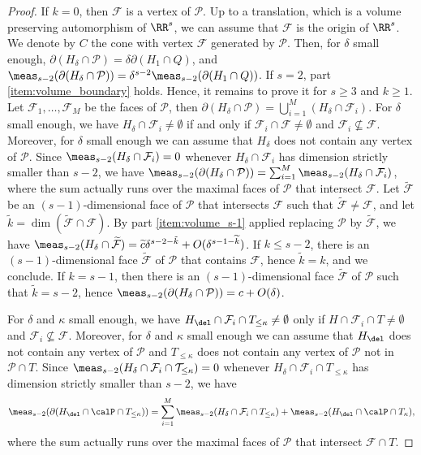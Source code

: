 \begin{proof}
If $k=0$, then $\mathcal F$ is a vertex of $\mathcal P$.
Up to a translation, which is a volume preserving automorphism of $\RR^s$,
we can assume that $\mathcal F$ is the origin of $\RR^s$.
We denote by $C$ the cone with vertex $\mathcal F$ generated by $\mathcal P$.
Then, for $\delta$ small enough,
$\partial(H_\delta\cap\mathcal P)=\delta\partial(H_1\cap Q)$,
and $\meas_{s-2}(\partial(H_\delta\cap\mathcal P))=\delta^{s-2}\meas_{s-2} (\partial(H_1\cap Q))$.
If $s=2$, part \eqref{item:volume_boundary} holds. Hence, it remains to prove it
for $s\geq3$ and $k\geq1$.
Let $\mathcal F_1,\dots,\mathcal F_M$ be the faces of $\mathcal P$,
then $\partial (H_\delta\cap\mathcal P)=\bigcup_{i=1}^M(H_\delta\cap\mathcal F_i)$.
For $\delta$ small enough, we have $H_\delta\cap\mathcal F_i\neq\emptyset$
if and only if $\mathcal F_i\cap\mathcal F\neq\emptyset$ and $\mathcal F_i\nsubseteq\mathcal F$.
Moreover, for $\delta$ small enough we can assume that $H_\delta$
does not contain any vertex of $\mathcal P$.
Since $\meas_{s-2}(H_\delta\cap\mathcal F_i)=0$ whenever $H_\delta\cap\mathcal F_i$
has dimension strictly smaller than $s-2$, we have
$\meas_{s-2}(\partial(H_\delta\cap\mathcal P))=\sum_{i=1}^M\meas_{s-2}(H_\delta\cap\mathcal F_i)$,
where the sum actually runs over the maximal faces of $\mathcal P$ that intersect $\mathcal F$.
Let $\widetilde {\mathcal F}$ be an $(s-1)$-dimensional face of $\mathcal P$ that intersects
$\mathcal F$ such that $\widetilde {\mathcal F}\neq\mathcal F$,
and let $\tilde k=\dim(\widetilde{\mathcal F}\cap\mathcal F)$.
By part \eqref{item:volume_s-1} applied replacing $\mathcal P$ by $\widetilde{\mathcal F}$, we have
$\meas_{s-2}(H_\delta\cap\widetilde{\mathcal F})
=\widetilde c \delta^{s-2-\tilde k}+O(\delta^{s-1-\widetilde k})$.
If $k\leq s-2$, there is an $(s-1)$-dimensional face $\widetilde {\mathcal F}$ of $\mathcal P$
that contains $\mathcal F$, hence $\tilde k=k$, and we conclude.
If $k=s-1$, then there is an $(s-1)$-dimensional face $\widetilde {\mathcal F}$
of $\mathcal P$ such that $\tilde k=s-2$, hence
$\meas_{s-2} (\partial(H_\delta \cap \mathcal P))= c +O(\delta)$.

For $\delta$ and $\kappa$ small enough, we have $H_{\del}\cap \mathcal F_i\cap T_{\leq\kappa}\neq\emptyset$
only if $H\cap \mathcal F_i\cap T\neq\emptyset$ and $\mathcal F_i\nsubseteq \mathcal F$.
Moreover, for $\delta$ and $\kappa$ small enough we can assume that $H_{\del}$ does not contain any
vertex of $\mathcal P$ and $T_{\leq\kappa}$ does not contain any vertex of $\mathcal P$ not in $\mathcal P\cap T$.
Since $\meas_{s-2}(H_\delta\cap\mathcal F_i \cap \mathcal T_{\leq\kappa})=0$ whenever
$H_\delta\cap\mathcal F_i\cap T_{\leq\kappa}$ has dimension strictly smaller than $s-2$, we have
\[
\meas_{s-2}(\partial (H_{\del}\cap \calP\cap T_{\leq\kappa}))
=\sum_{i=1}^M\meas_{s-2}(H_\delta\cap\mathcal F_i\cap T_{\leq\kappa})
+\meas_{s-2}(H_{\del}\cap \calP\cap T_\kappa),
\]
where the sum actually runs over the maximal faces of $\mathcal P$ that intersect $\mathcal F\cap T$.


\end{proof}
